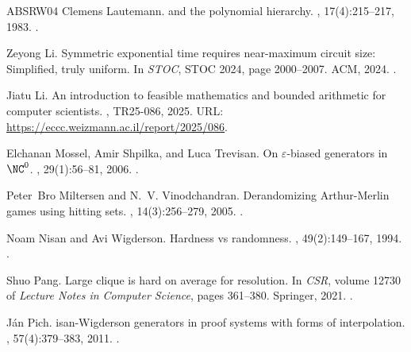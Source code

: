 \documentclass[10pt,a4paper]{article}
\theoremstyle{definition}
\theoremstyle{remark}
\begin{document}
\begin{thebibliography}{ABSRW04}
Clemens Lautemann.
\newblock {$\BPP$} and the polynomial hierarchy.
, 17(4):215--217, 1983.
\newblock \href {https://doi.org/10.1016/0020-0190(83)90044-3}
  {}.

Zeyong Li.
\newblock Symmetric exponential time requires near-maximum circuit size:
  Simplified, truly uniform.
\newblock In {\em {STOC}}, STOC 2024, page 2000–2007. {ACM}, 2024.
\newblock \href {https://doi.org/10.1145/3618260.3649615}
  {}.

Jiatu Li.
\newblock An introduction to feasible mathematics and bounded arithmetic for
  computer scientists.
, {TR25-086}, 2025.
\newblock URL: \url{https://eccc.weizmann.ac.il/report/2025/086}.

Elchanan Mossel, Amir Shpilka, and Luca Trevisan.
\newblock On {$\varepsilon$}-biased generators in {$\NC^0$}.
, 29(1):56--81, 2006.
\newblock \href {https://doi.org/10.1002/RSA.20112}
  {}.

Peter~Bro Miltersen and N.~V. Vinodchandran.
\newblock Derandomizing {A}rthur-{M}erlin games using hitting sets.
, 14(3):256--279, 2005.
\newblock \href {https://doi.org/10.1007/S00037-005-0197-7}
  {}.

Noam Nisan and Avi Wigderson.
\newblock Hardness vs randomness.
, 49(2):149--167, 1994.
\newblock \href {https://doi.org/10.1016/S0022-0000(05)80043-1}
  {}.

Shuo Pang.
\newblock Large clique is hard on average for resolution.
\newblock In {\em {CSR}}, volume 12730 of {\em Lecture Notes in Computer
  Science}, pages 361--380. Springer, 2021.
\newblock \href {https://doi.org/10.1007/978-3-030-79416-3\_22}
  {}.

J{\'{a}}n Pich.
isan-{W}igderson generators in proof systems with forms of
  interpolation.
, 57(4):379--383, 2011.
\newblock \href {https://doi.org/10.1002/MALQ.201010012}
  {}.


\end{thebibliography}
\end{document}
